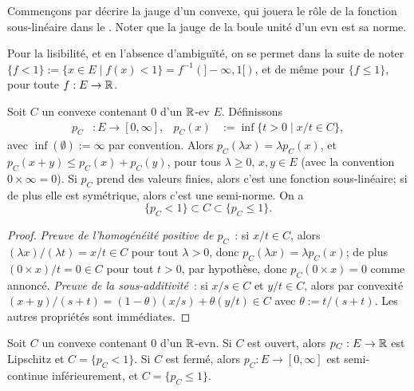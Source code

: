 Commençons par décrire la jauge d'un convexe, qui jouera le rôle de la fonction sous-linéaire dans le . Noter que la jauge de la boule unité d'un evn est sa norme. 

Pour la lisibilité, et en l'absence d'ambiguïté, on se permet dans la suite de noter 
$\{f < 1\} := \{x \in E \mid f(x) < 1\} = f^{-1}(]-\infty,1[)$, et de même pour $\{f\leq 1\}$, pour toute $f : E \to \mathbb{R}$.

\begin{proposition}
\label{prop:jaugeCvx}
%
Soit $C$ un convexe contenant $0$ d'un $\mathbb{R}$-ev $E$. Définissons 
\begin{align*}
	p_C &: E \to [0,\infty], & p_C(x) &:= \inf\{t > 0 \mid x/t \in C\},
\end{align*} 
avec $\inf(\emptyset) := \infty$ par convention.
Alors $p_C(\lambda x) = \lambda p_C(x)$, et $p_C(x+y) \leq p_C(x)+p_C(y)$, pour tous $\lambda \geq 0$, $x,y \in E$ (avec la convention $0 \times \infty = 0$). 
Si $p_C$ prend des valeurs finies, alors c'est une fonction sous-linéaire; si de plus elle est symétrique, alors c'est une semi-norme. 
On a 
\begin{equation*}
\{p_C < 1\} \subset C \subset \{p_C \leq 1\}.	
\end{equation*}
\end{proposition}

\begin{proof}
	\emph{Preuve de l'homogénéité positive de $p_C$}~:
	si $x/t \in C$, alors $(\lambda x)/(\lambda t) = x/t \in C$ pour tout $\lambda>0$, donc $p_C(\lambda x) = \lambda p_C(x)$; de plus $(0\times x) / t = 0 \in C$ pour tout $t>0$, par hypothèse, donc $p_C(0\times x) = 0$ comme annoncé. 
	\emph{Preuve de la sous-additivité}~: 
	si $x/s \in C$ et $y/t \in C$, alors par convexité $(x+y)/(s+t) = (1-\theta)(x/s) + \theta (y/t) \in C$ avec $\theta := t/(s+t)$. 
	Les autres propriétés sont immédiates. 
\end{proof}


\begin{lemma}
\label{lem:jaugeOuvertCvx}
%
	Soit $C$ un convexe contenant $0$ d'un $\mathbb{R}$-evn. Si $C$ est ouvert, alors $p_C : E \to \mathbb{R}$ est Lipschitz et $C = \{p_C < 1\}$. Si $C$ est fermé, alors $p_C : E \to [0,\infty]$ est semi-continue inférieurement, et $C = \{p_C \leq 1\}$.
\end{lemma}

